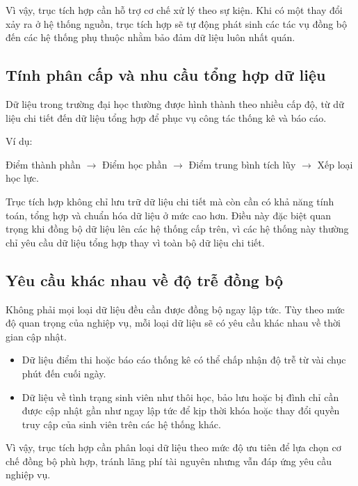     Vì vậy, trục tích hợp cần hỗ trợ cơ chế xử lý theo sự kiện. Khi có một thay đổi xảy ra ở hệ thống nguồn, trục tích hợp sẽ tự động phát sinh các tác vụ đồng bộ đến các hệ thống phụ thuộc nhằm bảo đảm dữ liệu luôn nhất quán.

    \subsection{Tính phân cấp và nhu cầu tổng hợp dữ liệu}
    
    Dữ liệu trong trường đại học thường được hình thành theo nhiều cấp độ, từ dữ liệu chi tiết đến dữ liệu tổng hợp để phục vụ công tác thống kê và báo cáo.
    
    Ví dụ:
    
    Điểm thành phần $\rightarrow$ Điểm học phần $\rightarrow$ Điểm trung bình tích lũy $\rightarrow$ Xếp loại học lực.
    
    Trục tích hợp không chỉ lưu trữ dữ liệu chi tiết mà còn cần có khả năng tính toán, tổng hợp và chuẩn hóa dữ liệu ở mức cao hơn. Điều này đặc biệt quan trọng khi đồng bộ dữ liệu lên các hệ thống cấp trên, vì các hệ thống này thường chỉ yêu cầu dữ liệu tổng hợp thay vì toàn bộ dữ liệu chi tiết.

    \subsection{Yêu cầu khác nhau về độ trễ đồng bộ}
    
    Không phải mọi loại dữ liệu đều cần được đồng bộ ngay lập tức. Tùy theo mức độ quan trọng của nghiệp vụ, mỗi loại dữ liệu sẽ có yêu cầu khác nhau về thời gian cập nhật.
    
    \begin{itemize}
        \item Dữ liệu điểm thi hoặc báo cáo thống kê có thể chấp nhận độ trễ từ vài chục phút đến cuối ngày.
        \item Dữ liệu về tình trạng sinh viên như thôi học, bảo lưu hoặc bị đình chỉ cần được cập nhật gần như ngay lập tức để kịp thời khóa hoặc thay đổi quyền truy cập của sinh viên trên các hệ thống khác.
    \end{itemize}
    
    Vì vậy, trục tích hợp cần phân loại dữ liệu theo mức độ ưu tiên để lựa chọn cơ chế đồng bộ phù hợp, tránh lãng phí tài nguyên nhưng vẫn đáp ứng yêu cầu nghiệp vụ.